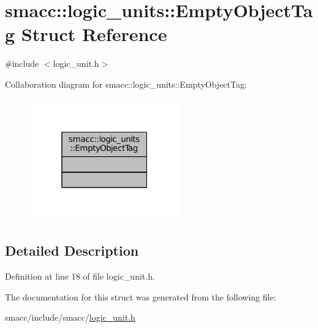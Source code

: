 \hypertarget{structsmacc_1_1logic__units_1_1EmptyObjectTag}{}\section{smacc\+:\+:logic\+\_\+units\+:\+:Empty\+Object\+Tag Struct Reference}
\label{structsmacc_1_1logic__units_1_1EmptyObjectTag}


{\ttfamily \#include $<$logic\+\_\+unit.\+h$>$}



Collaboration diagram for smacc\+:\+:logic\+\_\+units\+:\+:Empty\+Object\+Tag\+:
\nopagebreak
\begin{figure}[H]
\begin{center}
\leavevmode
\includegraphics[width=184pt]{structsmacc_1_1logic__units_1_1EmptyObjectTag__coll__graph}
\end{center}
\end{figure}


\subsection{Detailed Description}


Definition at line 18 of file logic\+\_\+unit.\+h.



The documentation for this struct was generated from the following file\+:\begin{DoxyCompactItemize}
\item 
smacc/include/smacc/\hyperlink{logic__unit_8h}{logic\+\_\+unit.\+h}\end{DoxyCompactItemize}
